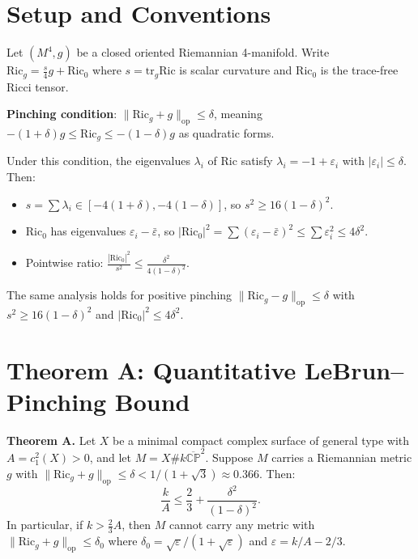 
\section{Setup and Conventions}

Let $(M^4, g)$ be a closed oriented Riemannian 4-manifold.
Write $\mathrm{Ric}_g = \frac{s}{4}g + \mathrm{Ric}_0$ where $s = \mathrm{tr}_g \mathrm{Ric}$ 
is scalar curvature and $\mathrm{Ric}_0$ is the trace-free Ricci tensor.

\textbf{Pinching condition}: $\|\mathrm{Ric}_g + g\|_{\mathrm{op}} \leq \delta$, meaning
$-(1+\delta)g \leq \mathrm{Ric}_g \leq -(1-\delta)g$ as quadratic forms.

Under this condition, the eigenvalues $\lambda_i$ of $\mathrm{Ric}$ satisfy 
$\lambda_i = -1 + \varepsilon_i$ with $|\varepsilon_i| \leq \delta$. Then:
\begin{itemize}
\item $s = \sum \lambda_i \in [-4(1+\delta), -4(1-\delta)]$, so $s^2 \geq 16(1-\delta)^2$.
\item $\mathrm{Ric}_0$ has eigenvalues $\varepsilon_i - \bar\varepsilon$, so 
      $|\mathrm{Ric}_0|^2 = \sum(\varepsilon_i - \bar\varepsilon)^2 \leq \sum \varepsilon_i^2 \leq 4\delta^2$.
\item Pointwise ratio: $\frac{|\mathrm{Ric}_0|^2}{s^2} \leq \frac{\delta^2}{4(1-\delta)^2}$.
\end{itemize}

The same analysis holds for positive pinching $\|\mathrm{Ric}_g - g\|_{\mathrm{op}} \leq \delta$
with $s^2 \geq 16(1-\delta)^2$ and $|\mathrm{Ric}_0|^2 \leq 4\delta^2$.

\section{Theorem A: Quantitative LeBrun--Pinching Bound}

\textbf{Theorem A.} Let $X$ be a minimal compact complex surface of general type
with $A = c_1^2(X) > 0$, and let $M = X \# k\overline{\mathbb{CP}}^2$.
Suppose $M$ carries a Riemannian metric $g$ with 
$\|\mathrm{Ric}_g + g\|_{\mathrm{op}} \leq \delta < 1/(1+\sqrt{3}) \approx 0.366$.
Then:
\[
\frac{k}{A} \leq \frac{2}{3} + \frac{\delta^2}{(1-\delta)^2}.
\]
In particular, if $k > \frac{2}{3}A$, then $M$ cannot carry any metric with 
$\|\mathrm{Ric}_g + g\|_{\mathrm{op}} \leq \delta_0$ where $\delta_0 = \sqrt{\varepsilon}/(1+\sqrt{\varepsilon})$
and $\varepsilon = k/A - 2/3$.

